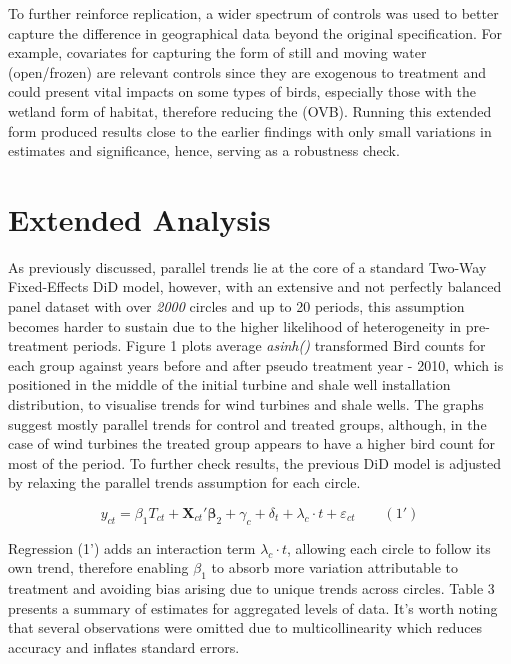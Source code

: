 \documentclass{article}
\begin{document}
\addlinespace

To further reinforce replication, a wider spectrum of controls was used to better capture the difference in geographical data beyond the original specification. For example, covariates for capturing the form of still and moving water (open/frozen) are relevant controls since they are exogenous to treatment and could present vital impacts on some types of birds, especially those with the wetland form of habitat, therefore reducing the (OVB). Running this extended form produced results close to the earlier findings with only small variations in estimates and significance, hence, serving as a robustness check.

\section{Extended Analysis}

As previously discussed, parallel trends lie at the core of a standard Two-Way Fixed-Effects DiD model, however, with an extensive and not perfectly balanced panel dataset with over \textit{2000} circles and up to 20 periods, this assumption becomes harder to sustain due to the higher likelihood of heterogeneity in pre-treatment periods. Figure 1 plots average \textit{asinh()} transformed Bird counts for each group against years before and after pseudo treatment year - 2010, which is positioned in the middle of the initial turbine and shale well installation distribution, to visualise trends for wind turbines and shale wells. The graphs suggest mostly parallel trends for control and treated groups, although, in the case of wind turbines the treated group appears to have a higher bird count for most of the period. To further check results, the previous DiD model is adjusted by relaxing the parallel trends assumption for each circle.

\addlinespace
\[
y_{ct} = \beta_1 T_{ct} + \mathbf{X}_{ct}' \boldsymbol{\beta}_2 + \gamma_c + \delta_t + \lambda_c \cdot t + \varepsilon_{ct} \hspace{2em} (1')
\]
\addlinespace

Regression (1') adds an interaction term \( \lambda_c \cdot t \), allowing each circle to follow its own trend, therefore enabling \( \beta_1 \) to absorb more variation attributable to treatment and avoiding bias arising due to unique trends across circles. Table 3 presents a summary of estimates for aggregated levels of data. It's worth noting that several observations were omitted due to multicollinearity which reduces accuracy and inflates standard errors.
\end{document}
